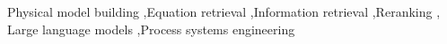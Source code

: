 Physical model building \sep Equation retrieval \sep Information retrieval \sep Reranking \sep
Large language models \sep Process systems engineering
